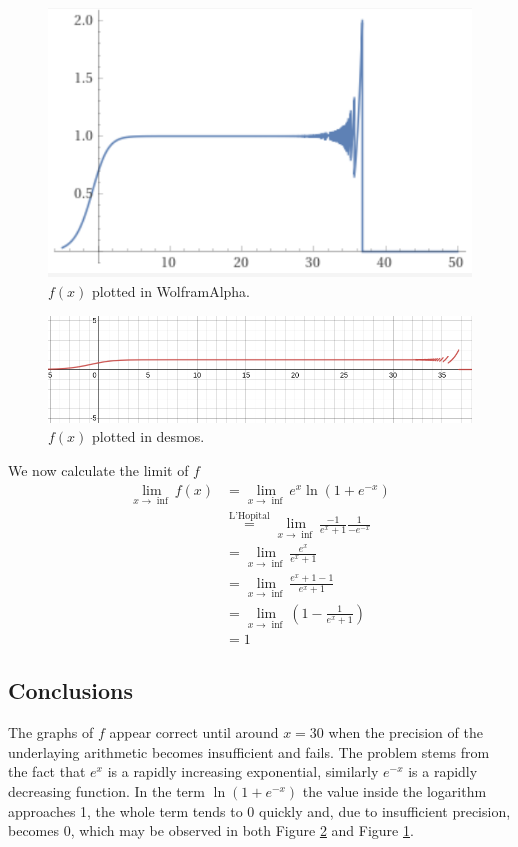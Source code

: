 \documentclass[a4paper, 12pt]{article}
\begin{document}
\begin{figure}
\centering
\includegraphics[width=0.75\linewidth]{wolfram.png}
\caption{$f(x)$ plotted in WolframAlpha.}
\label{fig:wolfram}
\end{figure}
\begin{figure}
\centering
\includegraphics[width=0.75\linewidth]{desmos.png}
\caption{$f(x)$ plotted in desmos.}
\label{fig:desmos}
\end{figure}

We now calculate the limit of $f$
\begin{align*}
\lim_{x \to \inf} f(x) &= \lim_{x \to \inf} e^x\ln\left(1+e^{-x}\right) \\
&\stackrel{\text{L'Hopital}}{=} \lim_{x \to \inf} \frac{-1}{e^x + 1} \frac{1}{-e^{-x}} \\
&= \lim_{x \to \inf} \frac{e^x}{e^x + 1} \\
&= \lim_{x \to \inf} \frac{e^x + 1 - 1}{e^x + 1} \\
&= \lim_{x \to \inf} \left(1 - \frac{1}{e^x + 1}\right) \\
&= 1
\end{align*}

\subsection{Conclusions}
The graphs of $f$ appear correct until around $x = 30$ when the precision of the
underlaying arithmetic becomes insufficient and fails. The problem stems from
the fact that $e^x$ is a rapidly increasing exponential, similarly $e^{-x}$ is a
rapidly decreasing function. In the term $\ln(1 + e^{-x})$ the value inside the
logarithm approaches 1, the whole term tends to 0 quickly and, due to
insufficient precision, becomes 0, which may be observed in both Figure
\ref{fig:desmos} and Figure \ref{fig:wolfram}.
\end{document}
